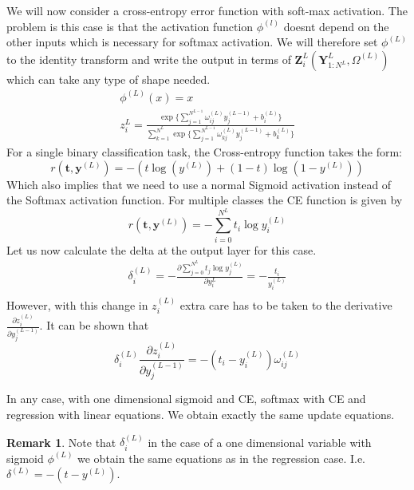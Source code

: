 \documentclass[a4paper,10pt]{article}
\theoremstyle{definition}
\newtheorem{remark}{Remark}
\begin{document}
We will now consider a cross-entropy error function with soft-max activation. The problem is this case is that the activation function $\phi^{(l)}$ doesnt depend on the other inputs which is necessary for softmax activation. We will therefore set $\phi^{(L)}$ to the identity transform and write the output in terms of $\pmb{Z}_i^{L}(\pmb{Y}_{1:N^L}^L, \Omega^{(L)})$ which can take any type of shape needed.
\begin{gather}
\phi^{(L)}(x) = x\\
z^L_i = \frac{\exp\{ \sum_{j = 1}^{N^{L-1}}\omega_{ij}^{(L)} y_j^{(L-1)} + b^{(L)}_i\}}{\sum_{k = 1}^{N^L} \exp\{\sum_{j = 1}^{N^{L-1}}\omega_{kj}^{(L)} y_j^{(L-1)} + b^{(L)}_k\}}
\end{gather}
For a single binary classification task, the Cross-entropy function takes the form:
\begin{equation}
r(\pmb{t}, \pmb{y}^{(L)}) = -(t \log(y^{(L)}) + (1 - t)\log(1 - y^{(L)}))
\end{equation} 
Which also implies that we need to use a normal Sigmoid activation instead of the Softmax activation function. For multiple classes the CE function is given by
\begin{equation}
r(\pmb{t}, \pmb{y}^{(L)}) = - \sum_{i = 0}^{N^L} t_i \log{y^{(L)}_i}
\end{equation}
Let us now calculate the delta at the output layer for this case.
\begin{gather}
\delta_i^{(L)} =-\frac{\partial\sum_{j = 0}^{N^L} t_j \log{y^{(L)}_j}}{\partial y_i^{L}} = -\frac{t_i}{y_i^{(L)}}\\
\end{gather} 
However, with this change in $z_i^{(L)}$ extra care has to be taken to the derivative $\frac{\partial z_i^{(L)}}{\partial y_j^{(L-1)}}$. It can be shown that
\begin{equation}
\delta_i^{(L)}\frac{\partial z_i^{(L)}}{\partial y_j^{(L-1)}} = -(t_i - y_i^{(L)})\omega_{ij}^{(L)}
\end{equation}

In any case, with one dimensional sigmoid and CE, softmax with CE and regression with linear equations. We obtain exactly the same update equations.

\begin{remark}
	Note that $\delta_i^{(L)}$ in the case of a one dimensional variable with sigmoid $\phi^{(L)}$ we obtain the same equations as in the regression case. I.e. $\delta^{(L)} = -(t - y^{(L)})$.
\end{remark}
\end{document}
